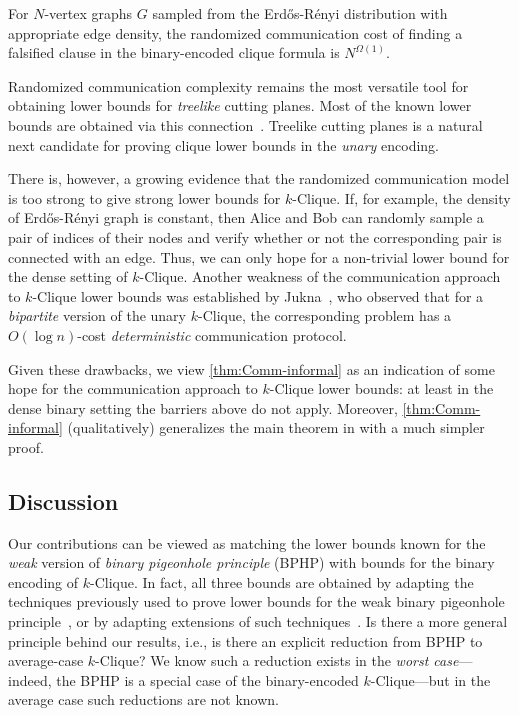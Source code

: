 \documentclass[10pt,a4paper]{article}
\theoremstyle{definition}
\theoremstyle{remark}
\theoremstyle{example}
\theoremstyle{plain}
\newcommand{\graphSize}{N}
\newcommand{\kClique}{$k$-\textsf{Clique}\xspace}
\providecommand{\erdosrenyi}{Erd\H{o}s-R\'{e}nyi\xspace}
\begin{document}
\begin{theorem}[Informal]\label{thm:Comm-informal}
    For $\graphSize$-vertex graphs $G$ sampled from the \erdosrenyi distribution with appropriate edge density, the randomized communication cost of finding a falsified clause in the binary-encoded clique formula is $\graphSize^{\Omega(1)}$.
\end{theorem}
Randomized communication complexity remains the most versatile tool for obtaining lower bounds for \emph{treelike} cutting planes. Most of the known lower bounds are obtained via this connection~\cite{IPU94Treelike,BPS07LS,HuynhN12,GP18CommunicationLowerBounds,IR21}. 
Treelike cutting planes is a natural next candidate for proving clique lower bounds in the \emph{unary} encoding.

There is, however, a growing evidence that the randomized communication model is too strong to give strong lower bounds for \kClique. If, for example, the density of \erdosrenyi graph is constant, then Alice and Bob can randomly sample a pair of indices of their nodes and verify whether or not the corresponding pair is connected with an edge. Thus, we can only hope for a non-trivial lower bound for the dense setting of \kClique. 
Another weakness of the communication approach to \kClique lower bounds was established by Jukna~\cite{Jukna12}, who observed that for a \emph{bipartite} version of the unary \kClique, the corresponding problem has a $O(\log n)$-cost \emph{deterministic} communication protocol.

Given these drawbacks, we view \cref{thm:Comm-informal} as an indication of some hope for the communication approach to \kClique lower bounds: at least in the dense binary setting the barriers above do not apply. Moreover, \cref{thm:Comm-informal} (qualitatively) generalizes the main theorem in \cite{YZ24Comm} with a much simpler proof.


\subsection{Discussion}

Our contributions can be viewed
as matching the lower bounds known for the \emph{weak} version of  \emph{binary pigeonhole principle} (BPHP) 
with bounds for the binary encoding of \kClique. 
In fact, all  three bounds are obtained by adapting 
the techniques previously used to prove lower bounds for the weak binary pigeonhole principle~\cite{BeameW2025multiparty,BI25bphp}, or by adapting extensions of such techniques~\cite{GoosGJL2025quantum,YZ24Comm}. 
Is there a more general principle behind our results, i.e., is there an explicit reduction from BPHP to average-case \kClique?
We know such a reduction exists in the \emph{worst case}---indeed, the BPHP is a special case of the binary-encoded \kClique---but in the average case such reductions are not known.
\end{document}
